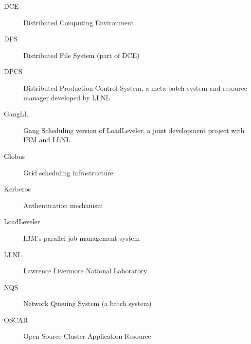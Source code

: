 \begin{description}
\item[DCE]	Distributed Computing Environment
\item[DFS]	Distributed File System (part of DCE)
\item[DPCS]	Distributed Production Control System, a meta-batch system 
		and resource manager developed by LLNL
\item[GangLL]	Gang Scheduling version of LoadLeveler, a joint development 
		project with IBM and LLNL
\item[Globus]	Grid scheduling infrastructure
\item[Kerberos]	Authentication mechanism
\item[LoadLeveler] IBM's parallel job management system
\item[LLNL]	Lawrence Livermore National Laboratory
\item[NQS]	Network Queuing System (a batch system)
\item[OSCAR]	Open Source Cluster Application Resource
\end{description}

\newpage


